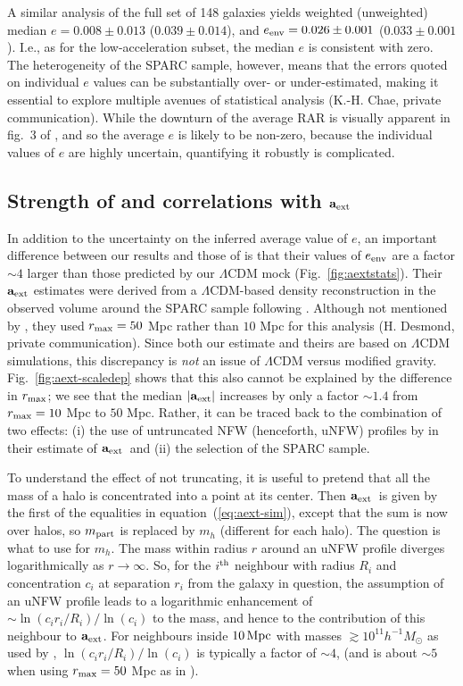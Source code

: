 \documentclass[usenatbib]{mnras}
\newcommand{\aext}{\ensuremath{\mathbf{a}_{\rm ext}}}
\newcommand{\Mh}{\ensuremath{h^{-1}M_{\odot}}}
\begin{document}
A similar analysis of the full set of 148 galaxies yields weighted (unweighted) median $e=0.008\pm0.013$ ($0.039\pm0.014$), and $e_{\rm env} = 0.026\pm0.001$ ($0.033\pm0.001$).  I.e., as for the low-acceleration subset, the median $e$ is consistent with zero.  The heterogeneity of the SPARC sample, however, means that the errors quoted on individual $e$ values can be substantially over- or under-estimated, making it essential to explore multiple avenues of statistical analysis (K.-H. Chae, private communication).
While the downturn of the average RAR is visually apparent in fig.~3 of , and so the average $e$ is likely to be non-zero, because the individual values of $e$ are highly uncertain, quantifying it robustly is complicated. 

\subsection{Strength of and correlations with $\aext$}
In addition to the uncertainty on the inferred average value of $e$, an important difference between our results and those of  is that their values of $e_{\rm env}$ are a factor $\sim4$ larger than those predicted by our $\Lambda$CDM mock (Fig.~\ref{fig:aextstats}). Their $\aext$ estimates were derived from a $\Lambda$CDM-based density reconstruction in the observed volume around the SPARC sample following . Although not mentioned by , they used $r_{\rm max}=50$ Mpc rather than $10$ Mpc for this analysis (H. Desmond, private communication).  Since both our estimate and theirs are based on $\Lambda$CDM simulations, this discrepancy is {\em not} an issue of $\Lambda$CDM versus modified gravity. Fig.~\ref{fig:aext-scaledep} shows that this also cannot be explained by the difference in $r_{\rm max}$; we see that the median $|\aext|$ increases by only a factor $\sim1.4$ from $r_{\rm max}=10$ Mpc to $50$ Mpc. Rather, it can be traced back to the combination of two effects: (i) the use of untruncated NFW (henceforth, uNFW) profiles by  in their estimate of \aext\ and (ii) the selection of the SPARC sample.

To understand the effect of not truncating, it is useful to pretend that all the mass of a halo is concentrated into a point at its center.  Then \aext\ is given by the first of the equalities in equation~(\ref{eq:aext-sim}), except that the sum is now over halos, so $m_{\rm part}$ is replaced by $m_h$ (different for each halo).  The question is what to use for $m_h$.  The mass within radius $r$ around an uNFW profile diverges logarithmically as $r\to\infty$. So, for the $i^{\rm th}$ neighbour with radius $R_i$ and concentration $c_i$ at separation $r_i$ from the galaxy in question, the assumption of an uNFW profile leads to a logarithmic enhancement of $\sim\ln(c_ir_i/R_i)/\ln(c_i)$ to the mass, and hence to the contribution of this neighbour to \aext.  For neighbours inside $10\,{\rm Mpc}$ with masses $\gtrsim10^{11}\Mh$ as used by , $\ln(c_ir_i/R_i)/\ln(c_i)$ is typically a factor of $\sim4$, (and is about $\sim5$ when using $r_{\rm max}=50$ Mpc as in ). 
\end{document}
